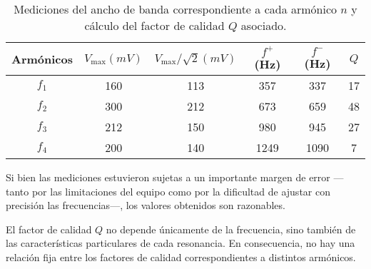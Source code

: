 \documentclass[12pt, a4paper]{article}
\begin{document}
\begin{table}[H]
    \centering
    \begin{tabular}{|c|c|c|c|c|c|}
    \hline
    \multirow{1}{2.1cm}{\centering Armónicos} 
        & $V_\mathrm{max} (mV)$
        & $V_\mathrm{max}/\sqrt{2} (mV)$ 
        & $f^+$ (Hz) 
        & $f^-$ (Hz)
        & $Q$ \\
    \hline
    $f_1$  & 160 & 113 & 357 & 337 & 17\\ \hline
    $f_2$  & 300 & 212 & 673 & 659 & 48\\ \hline
    $f_3$  & 212  & 150 & 980 & 945 & 27\\ \hline
    $f_4$  & 200  & 140 & 1249 & 1090 & 7\\ \hline
    \end{tabular}
    \caption{Mediciones del ancho de banda correspondiente a cada armónico $n$ y cálculo del factor de calidad $Q$ asociado.}
    \label{tabla3}
\end{table}

Si bien las mediciones estuvieron sujetas a un importante margen de error —tanto por las limitaciones del equipo como por la dificultad de ajustar con precisión las frecuencias—, los valores obtenidos son razonables. 

El factor de calidad $Q$ no depende únicamente de la frecuencia, sino también de las características particulares de cada resonancia. En consecuencia, no hay una relación fija entre los factores de calidad correspondientes a distintos armónicos.
\end{document}
